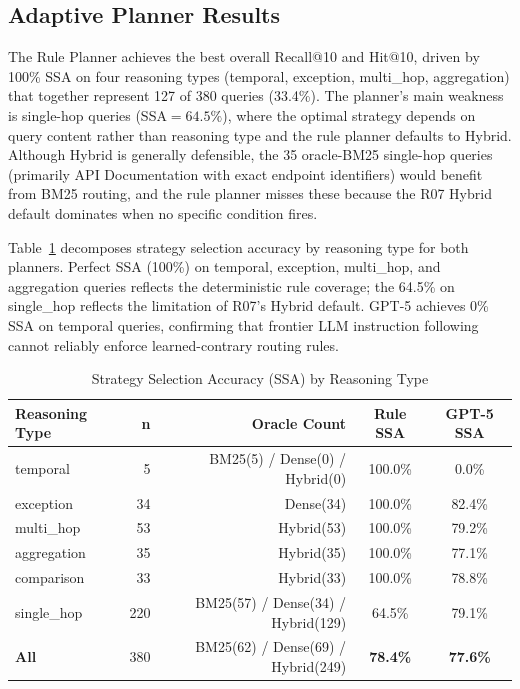 \documentclass[11pt, a4paper]{article}
\begin{document}
\subsection{Adaptive Planner Results}

The Rule Planner achieves the best overall Recall@10 and Hit@10, driven by 100\% SSA on four reasoning types (temporal, exception, multi\_hop, aggregation) that together represent 127 of 380 queries (33.4\%). The planner's main weakness is single-hop queries (SSA$={64.5\%}$), where the optimal strategy depends on query content rather than reasoning type and the rule planner defaults to Hybrid. Although Hybrid is generally defensible, the 35 oracle-BM25 single-hop queries (primarily API Documentation with exact endpoint identifiers) would benefit from BM25 routing, and the rule planner misses these because the R07 Hybrid default dominates when no specific condition fires.

Table~\ref{tab:ssa} decomposes strategy selection accuracy by reasoning type for both planners. Perfect SSA (100\%) on temporal, exception, multi\_hop, and aggregation queries reflects the deterministic rule coverage; the 64.5\% on single\_hop reflects the limitation of R07's Hybrid default. GPT-5 achieves 0\% SSA on temporal queries, confirming that frontier LLM instruction following cannot reliably enforce learned-contrary routing rules.

\begin{table}[htbp]
\centering
\caption{Strategy Selection Accuracy (SSA) by Reasoning Type}
\label{tab:ssa}
\begin{tabular}{lrrcc}
\toprule
\textbf{Reasoning Type} & \textbf{n} & \textbf{Oracle Count} & \textbf{Rule SSA} & \textbf{GPT-5 SSA} \\
\midrule
temporal     & 5   & BM25(5) / Dense(0) / Hybrid(0) & 100.0\% & 0.0\%  \\
exception    & 34  & Dense(34)                       & 100.0\% & 82.4\% \\
multi\_hop   & 53  & Hybrid(53)                      & 100.0\% & 79.2\% \\
aggregation  & 35  & Hybrid(35)                      & 100.0\% & 77.1\% \\
comparison   & 33  & Hybrid(33)                      & 100.0\% & 78.8\% \\
single\_hop  & 220 & BM25(57) / Dense(34) / Hybrid(129) & 64.5\% & 79.1\% \\
\midrule
\textbf{All} & 380 & BM25(62) / Dense(69) / Hybrid(249) & \textbf{78.4\%} & \textbf{77.6\%} \\
\bottomrule
\end{tabular}
\end{table}
\end{document}
